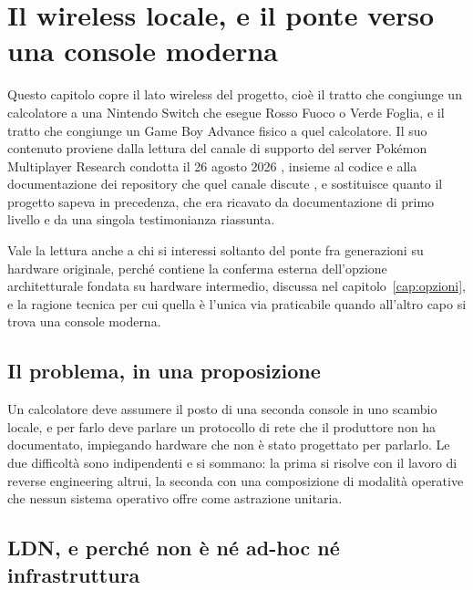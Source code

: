 
\chapter{Il wireless locale, e il ponte verso una console moderna}
\label{cap:ldn}

Questo capitolo copre il lato wireless del progetto, cioè il tratto che congiunge un calcolatore a una Nintendo Switch che esegue Rosso Fuoco o Verde Foglia, e il tratto che congiunge un Game Boy Advance fisico a quel calcolatore. Il suo contenuto proviene dalla lettura del canale di supporto del server Pokémon Multiplayer Research condotta il 26 agosto 2026 \cite{pmr-discord}, insieme al codice e alla documentazione dei repository che quel canale discute \cite{kinnay-ldn,ldnd,frlg-ldn-trade}, e sostituisce quanto il progetto sapeva in precedenza, che era ricavato da documentazione di primo livello e da una singola testimonianza riassunta.

Vale la lettura anche a chi si interessi soltanto del ponte fra generazioni su hardware originale, perché contiene la conferma esterna dell'opzione architetturale fondata su hardware intermedio, discussa nel capitolo~\ref{cap:opzioni}, e la ragione tecnica per cui quella è l'unica via praticabile quando all'altro capo si trova una console moderna.

\section{Il problema, in una proposizione}

Un calcolatore deve assumere il posto di una seconda console in uno scambio locale, e per farlo deve parlare un protocollo di rete che il produttore non ha documentato, impiegando hardware che non è stato progettato per parlarlo. Le due difficoltà sono indipendenti e si sommano: la prima si risolve con il lavoro di reverse engineering altrui, la seconda con una composizione di modalità operative che nessun sistema operativo offre come astrazione unitaria.

\section{LDN, e perché non è né ad-hoc né infrastruttura}

